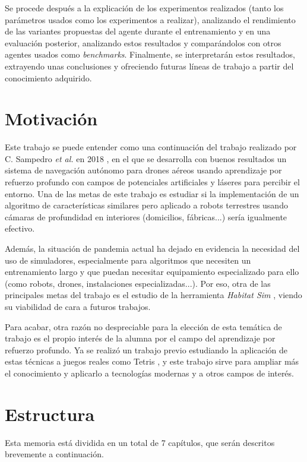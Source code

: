 Se procede después a la explicación de los experimentos realizados (tanto los parámetros usados como los experimentos a realizar), analizando el rendimiento de las variantes propuestas del agente durante el entrenamiento y en una evaluación posterior, analizando estos resultados y comparándolos con otros agentes usados como \textit{benchmarks}. Finalmente, se interpretarán estos resultados, extrayendo unas conclusiones y ofreciendo futuras líneas de trabajo a partir del conocimiento adquirido.

\section{Motivación}

Este trabajo se puede entender como una continuación del trabajo realizado por C. Sampedro \textit{et al.} en 2018 \cite{Sampedro2018}, en el que se desarrolla con buenos resultados un sistema de navegación autónomo para drones aéreos usando aprendizaje por refuerzo profundo con campos de potenciales artificiales y láseres para percibir el entorno. Una de las metas de este trabajo es estudiar si la implementación de un algoritmo de características similares pero aplicado a robots terrestres usando cámaras de profundidad en interiores (domicilios, fábricas...) sería igualmente efectivo.

Además, la situación de pandemia actual ha dejado en evidencia la necesidad del uso de simuladores, especialmente para algoritmos que necesiten un entrenamiento largo y que puedan necesitar equipamiento especializado para ello (como robots, drones, instalaciones especializadas...). Por eso, otra de las principales metas del trabajo es el estudio de la herramienta \textit{Habitat Sim} \cite{habitat19iccv} \cite{szot2021habitat}, viendo su viabilidad de cara a futuros trabajos.

Para acabar, otra razón no despreciable para la elección de esta temática de trabajo es el propio interés de la alumna por el campo del aprendizaje por refuerzo profundo. Ya se realizó un trabajo previo estudiando la aplicación de estas técnicas a juegos reales como Tetris \cite{Jimenez2020}, y este trabajo sirve para ampliar más el conocimiento y aplicarlo a tecnologías modernas y a otros campos de interés.

\section{Estructura}


Esta memoria está dividida en un total de 7 capítulos, que serán descritos brevemente a continuación.

